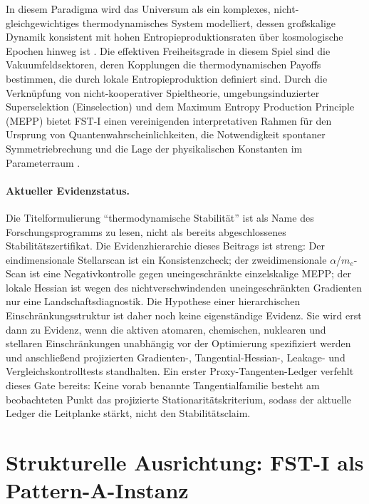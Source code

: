 \documentclass[12pt,a4paper]{article}
\theoremstyle{remark}
\begin{document}
In diesem Paradigma wird das Universum als ein komplexes, nicht-gleichgewichtiges thermodynamisches System modelliert, dessen gro\ss{}skalige Dynamik konsistent mit hohen Entropieproduktionsraten \"uber kosmologische Epochen hinweg ist \citep{MEPP2004}. Die effektiven Freiheitsgrade in diesem Spiel sind die Vakuumfeldsektoren, deren Kopplungen die thermodynamischen Payoffs bestimmen, die durch lokale Entropieproduktion definiert sind. Durch die Verkn\"upfung von nicht-kooperativer Spieltheorie, umgebungsinduzierter Superselektion (Einselection) und dem Maximum Entropy Production Principle (MEPP) bietet FST-I einen vereinigenden interpretativen Rahmen f\"ur den Ursprung von Quantenwahrscheinlichkeiten, die Notwendigkeit spontaner Symmetriebrechung und die Lage der physikalischen Konstanten im Parameterraum \citep{QuantumOptimization,LasryLions2007,HiggsVEV2024}.

\paragraph{Aktueller Evidenzstatus.} Die Titelformulierung ``thermodynamische Stabilität'' ist als Name des Forschungsprogramms zu lesen, nicht als bereits abgeschlossenes Stabilitätszertifikat. Die Evidenzhierarchie dieses Beitrags ist streng: Der eindimensionale Stellarscan ist ein Konsistenzcheck; der zweidimensionale $\alpha$/$m_e$-Scan ist eine Negativkontrolle gegen uneingeschränkte einzelskalige MEPP; der lokale Hessian ist wegen des nichtverschwindenden uneingeschränkten Gradienten nur eine Landschaftsdiagnostik. Die Hypothese einer hierarchischen Einschränkungsstruktur ist daher noch keine eigenständige Evidenz. Sie wird erst dann zu Evidenz, wenn die aktiven atomaren, chemischen, nuklearen und stellaren Einschränkungen unabhängig vor der Optimierung spezifiziert werden und anschließend projizierten Gradienten-, Tangential-Hessian-, Leakage- und Vergleichskontrolltests standhalten. Ein erster Proxy-Tangenten-Ledger verfehlt dieses Gate bereits: Keine vorab benannte Tangentialfamilie besteht am beobachteten Punkt das projizierte Stationaritätskriterium, sodass der aktuelle Ledger die Leitplanke stärkt, nicht den Stabilitätsclaim.

\section{Strukturelle Ausrichtung: FST-I als Pattern-A-Instanz}
\label{sec:structural-alignment}
\end{document}
